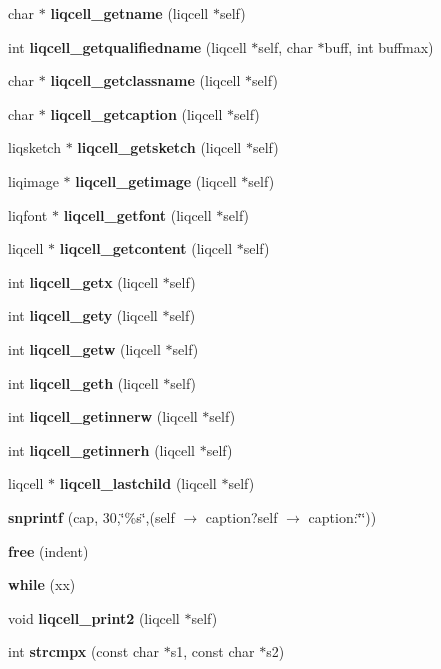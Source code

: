 \begin{CompactItemize}
\item 
char $\ast$ {\bf liqcell\_\-getname} (liqcell $\ast$self)
\item 
int {\bf liqcell\_\-getqualifiedname} (liqcell $\ast$self, char $\ast$buff, int buffmax)
\item 
char $\ast$ {\bf liqcell\_\-getclassname} (liqcell $\ast$self)
\item 
char $\ast$ {\bf liqcell\_\-getcaption} (liqcell $\ast$self)
\item 
liqsketch $\ast$ {\bf liqcell\_\-getsketch} (liqcell $\ast$self)
\item 
liqimage $\ast$ {\bf liqcell\_\-getimage} (liqcell $\ast$self)
\item 
liqfont $\ast$ {\bf liqcell\_\-getfont} (liqcell $\ast$self)
\item 
liqcell $\ast$ {\bf liqcell\_\-getcontent} (liqcell $\ast$self)
\item 
int {\bf liqcell\_\-getx} (liqcell $\ast$self)
\item 
int {\bf liqcell\_\-gety} (liqcell $\ast$self)
\item 
int {\bf liqcell\_\-getw} (liqcell $\ast$self)
\item 
int {\bf liqcell\_\-geth} (liqcell $\ast$self)
\item 
int {\bf liqcell\_\-getinnerw} (liqcell $\ast$self)
\item 
int {\bf liqcell\_\-getinnerh} (liqcell $\ast$self)
\item 
liqcell $\ast$ {\bf liqcell\_\-lastchild} (liqcell $\ast$self)
\item 
\textbf{snprintf} (cap, 30,\char`\"{}\%s\char`\"{},(self $\rightarrow$ caption?self $\rightarrow$ caption:\char`\"{}\char`\"{}))\label{d5/da2/liqcell_8c_01254f74c10199dc33fbc95dfc285e6f}

\item 
\textbf{free} (indent)\label{d5/da2/liqcell_8c_5e08d0179212ea3dc3998c1792e725fa}

\item 
\textbf{while} (xx)\label{d5/da2/liqcell_8c_e8232d93fc559419a35dd2c53a2a272d}

\item 
void {\bf liqcell\_\-print2} (liqcell $\ast$self)
\item 
int \textbf{strcmpx} (const char $\ast$s1, const char $\ast$s2)\label{d5/da2/liqcell_8c_432c1a35442cf6f8c0bcf9af17287407}


\end{CompactItemize}
